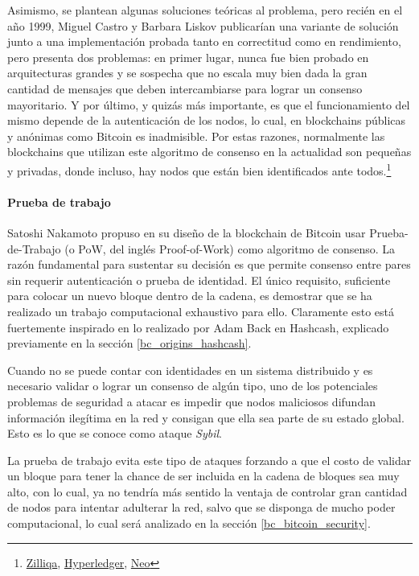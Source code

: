 Asimismo, se plantean algunas soluciones teóricas al problema, pero recién en el año 1999, Miguel Castro y Barbara Liskov publicarían una variante de solución junto a una implementación probada tanto en correctitud como en rendimiento\cite{Castro:1999:PBF:296806.296824}, pero presenta dos problemas: en primer lugar, nunca fue bien probado en arquitecturas grandes y se sospecha que no escala muy bien dada la gran cantidad de mensajes que deben intercambiarse para lograr un consenso mayoritario. Y por último, y quizás más importante, es que el funcionamiento del mismo depende de la autenticación de los nodos, lo cual, en blockchains públicas y anónimas como Bitcoin es inadmisible. Por estas razones, normalmente las blockchains que utilizan este algoritmo de consenso en la actualidad son pequeñas y privadas, donde incluso, hay nodos que están bien identificados ante todos.\footnote{\href{https://blockonomi.com/zilliqa-guide/}{Zilliqa}, \href{https://www.hyperledger.org/projects/fabric}{Hyperledger}, \href{https://neo.org/}{Neo}}

\paragraph{Prueba de trabajo}
\label{bc_bitcoin_pow}

Satoshi Nakamoto propuso en su diseño de la blockchain de Bitcoin usar Prueba-de-Trabajo (o PoW, del inglés Proof-of-Work) como algoritmo de consenso. La razón fundamental para sustentar su decisión es que permite consenso entre pares sin requerir autenticación o prueba de identidad. El único requisito, suficiente para colocar un nuevo bloque dentro de la cadena, es demostrar que se ha realizado un trabajo computacional exhaustivo para ello. Claramente esto está fuertemente inspirado en lo realizado por Adam Back en Hashcash, explicado previamente en la sección \ref{bc_origins_hashcash}.

Cuando no se puede contar con identidades en un sistema distribuido y es necesario validar o lograr un consenso de algún tipo, uno de los potenciales problemas de seguridad a atacar es impedir que nodos maliciosos difundan información ilegítima en la red y consigan que ella sea parte de su estado global. Esto es lo que se conoce como ataque \textit{Sybil}.

La prueba de trabajo evita este tipo de ataques forzando a que el costo de validar un bloque para tener la chance de ser incluida en la cadena de bloques sea muy alto, con lo cual, ya no tendría más sentido la ventaja de controlar gran cantidad de nodos para intentar adulterar la red, salvo que se disponga de mucho poder computacional, lo cual será analizado en la sección \ref{bc_bitcoin_security}.

